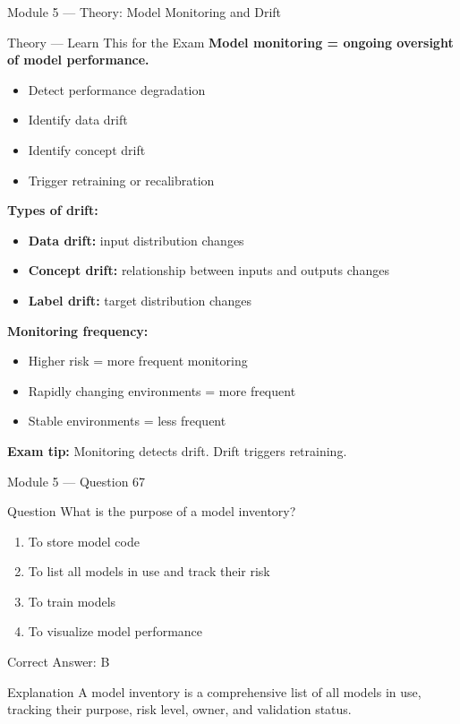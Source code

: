 \documentclass[aspectratio=169,10pt]{beamer}
\newcommand{\question}[1]{%
	\begin{block}{Question}
		#1
	\end{block}
}
\newcommand{\options}[4]{%
	\begin{enumerate}[label=\Alph*.,leftmargin=*]
		\item #1
		\item #2
		\item #3
		\item #4
	\end{enumerate}
}
\newcommand{\answerbox}[1]{%
	\begin{exampleblock}{Correct Answer: #1}
	\end{exampleblock}
}
\newcommand{\explain}[1]{%
	\begin{block}{Explanation}
		\small #1
	\end{block}
}
\newcommand{\theory}[1]{%
	\begin{block}{Theory --- Learn This for the Exam}
		\small #1
	\end{block}
}
\begin{document}
	\begin{frame}{Module 5 --- Theory: Model Monitoring and Drift}
		\theory{
			\textbf{Model monitoring = ongoing oversight of model performance.}
			\begin{itemize}
				\item Detect performance degradation
				\item Identify data drift
				\item Identify concept drift
				\item Trigger retraining or recalibration
			\end{itemize}
			\textbf{Types of drift:}
			\begin{itemize}
				\item \textbf{Data drift:} input distribution changes
				\item \textbf{Concept drift:} relationship between inputs and outputs changes
				\item \textbf{Label drift:} target distribution changes
			\end{itemize}
			\textbf{Monitoring frequency:}
			\begin{itemize}
				\item Higher risk = more frequent monitoring
				\item Rapidly changing environments = more frequent
				\item Stable environments = less frequent
			\end{itemize}
			\textbf{Exam tip:} Monitoring detects drift. Drift triggers retraining.
		}
	\end{frame}
	
	\begin{frame}{Module 5 --- Question 67}
		\question{What is the purpose of a model inventory?}
		\options{To store model code}{To list all models in use and track their risk}{To train models}{To visualize model performance}
		\answerbox{B}
		\explain{A model inventory is a comprehensive list of all models in use, tracking their purpose, risk level, owner, and validation status.}
	\end{frame}
	
\end{document}
